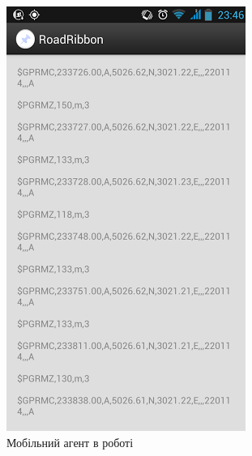 \documentclass[simple,a4paper,14pt,ukrainian,utf8]{eskdtext}
\begin{document}
		\begin{figure}
			\vspace{2em}
			\centering \includegraphics[scale=0.75]{images/mobile_screen.png}
			\caption{Мобільний агент в роботі}
		\end{figure}
		
		\clearpage \newpage
		
\end{document}
